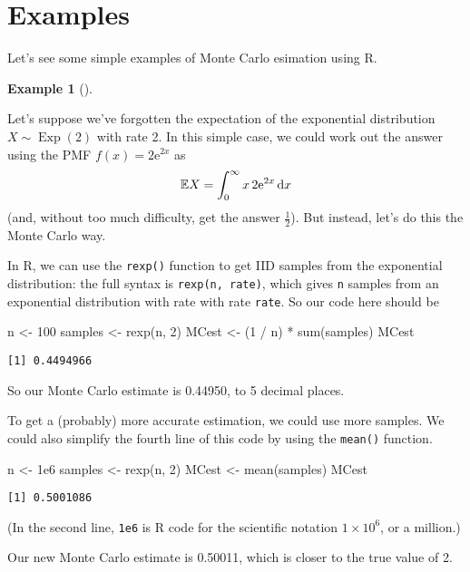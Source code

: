 \documentclass[
  letterpaper,
  DIV=11,
  numbers=noendperiod]{scrreprt}
\newenvironment{Shaded}{\begin{snugshade}}{\end{snugshade}}
\newcommand{\DecValTok}[1]{\textcolor[rgb]{0.68,0.00,0.00}{#1}}
\newcommand{\FloatTok}[1]{\textcolor[rgb]{0.68,0.00,0.00}{#1}}
\newcommand{\FunctionTok}[1]{\textcolor[rgb]{0.28,0.35,0.67}{#1}}
\newcommand{\NormalTok}[1]{\textcolor[rgb]{0.00,0.23,0.31}{#1}}
\newcommand{\OtherTok}[1]{\textcolor[rgb]{0.00,0.23,0.31}{#1}}
\newcommand{\SpecialCharTok}[1]{\textcolor[rgb]{0.37,0.37,0.37}{#1}}
\theoremstyle{definition}
\newtheorem{example}{Example}[chapter]
\theoremstyle{definition}
\theoremstyle{remark}
\begin{document}
\section{Examples}\label{examples}

Let's see some simple examples of Monte Carlo esimation using R.

\begin{example}[]\protect\hypertarget{exm-MCexp}{}\label{exm-MCexp}

Let's suppose we've forgotten the expectation of the exponential
distribution \(X \sim \operatorname{Exp}(2)\) with rate 2. In this
simple case, we could work out the answer using the PMF
\(f(x) = 2\mathrm{e}^{2x}\) as
\[ \mathbb{E} X = \int_0^\infty x\,2\mathrm{e}^{2x}\,\mathrm{d}x \] (and,
without too much difficulty, get the answer \(\frac12\)). But instead,
let's do this the Monte Carlo way.

In R, we can use the \texttt{rexp()} function to get IID samples from
the exponential distribution: the full syntax is
\texttt{rexp(n,\ rate)}, which gives \texttt{n} samples from an
exponential distribution with rate with rate \texttt{rate}. So our code
here should be

\begin{Shaded}
\begin{Highlighting}[]
\NormalTok{n }\OtherTok{\textless{}{-}} \DecValTok{100}
\NormalTok{samples }\OtherTok{\textless{}{-}} \FunctionTok{rexp}\NormalTok{(n, }\DecValTok{2}\NormalTok{)}
\NormalTok{MCest }\OtherTok{\textless{}{-}}\NormalTok{ (}\DecValTok{1} \SpecialCharTok{/}\NormalTok{ n) }\SpecialCharTok{*} \FunctionTok{sum}\NormalTok{(samples)}
\NormalTok{MCest}
\end{Highlighting}
\end{Shaded}

\begin{verbatim}
[1] 0.4494966
\end{verbatim}

So our Monte Carlo estimate is 0.44950, to 5 decimal places.

To get a (probably) more accurate estimation, we could use more samples.
We could also simplify the fourth line of this code by using the
\texttt{mean()} function.

\begin{Shaded}
\begin{Highlighting}[]
\NormalTok{n }\OtherTok{\textless{}{-}} \FloatTok{1e6}
\NormalTok{samples }\OtherTok{\textless{}{-}} \FunctionTok{rexp}\NormalTok{(n, }\DecValTok{2}\NormalTok{)}
\NormalTok{MCest }\OtherTok{\textless{}{-}} \FunctionTok{mean}\NormalTok{(samples)}
\NormalTok{MCest}
\end{Highlighting}
\end{Shaded}

\begin{verbatim}
[1] 0.5001086
\end{verbatim}

(In the second line, \texttt{1e6} is R code for the scientific notation
\(1 \times 10^6\), or a million.)

Our new Monte Carlo estimate is 0.50011, which is closer to the true
value of 2.

\end{example}
\end{document}
